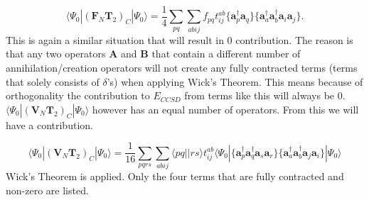 \documentclass[a4paper,norsk,11pt,twoside]{report}
\begin{document}
\begin{equation}
\langle \Psi_0 | (\textbf{F}_N \textbf{T}_2)_C | \Psi_0 \rangle = \frac{1}{4} \sum_{pq} \sum_{abij} f_{pq} t_{ij}^{ab} \{ \textbf{a}^{\dag}_p \textbf{a}_q \}
\{ \textbf{a}^{\dag}_a \textbf{a}^{\dag}_b \textbf{a}_i \textbf{a}_j \} .
\end{equation}
This is again a similar situation that will result in 0 contribution. The reason is that any two operators $\textbf{A}$ and $\textbf{B}$ that contain a different number of annihilation/creation operators will not create any fully contracted terms (terms that solely consists of $\delta$'s) when applying Wick's Theorem. This means because of orthogonality the contribution to $E_{CCSD}$ from terms like this will always be 0. \\

$\langle \Psi_0 | (\textbf{V}_N \textbf{T}_2)_C | \Psi_0 \rangle$ however has an equal number of operators. From this we will have a contribution.

\begin{equation}
\langle \Psi_0 | (\textbf{V}_N \textbf{T}_2)_C | \Psi_0 \rangle = \frac{1}{16} \sum_{pqrs} \sum_{abij} \langle pq||rs \rangle t_{ij}^{ab} \langle \Psi_0|
\{
\textbf{a}^{\dag}_p \textbf{a}^{\dag}_q
\textbf{a}_s \textbf{a}_r \}
\{
\textbf{a}^{\dag}_a \textbf{a}^{\dag}_b
\textbf{a}_j \textbf{a}_i \}
| \Psi_0 \rangle \nonumber
\end{equation}
Wick's Theorem is applied. Only the four terms that are fully contracted and non-zero are listed.
\end{document}
